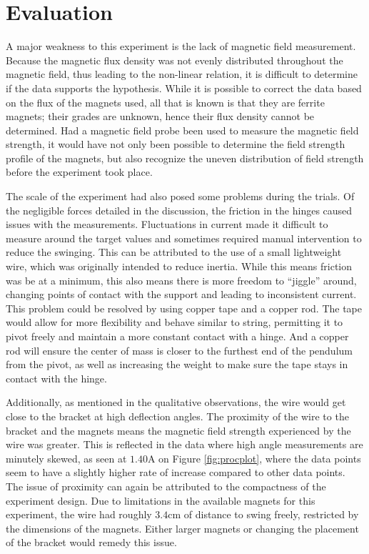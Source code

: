 \section*{Evaluation}

A major weakness to this experiment is the lack of magnetic field measurement.
Because the magnetic flux density was not evenly distributed throughout the magnetic field, thus leading to the non-linear relation, it is difficult to determine if the data supports the hypothesis.
While it is possible to correct the data based on the flux of the magnets used, all that is known is that they are ferrite magnets; their grades are unknown, hence their flux density cannot be determined.
Had a magnetic field probe been used to measure the magnetic field strength, it would have not only been possible to determine the field strength profile of the magnets, but also recognize the uneven distribution of field strength before the experiment took place.

The scale of the experiment had also posed some problems during the trials.
Of the negligible forces detailed in the discussion, the friction in the hinges caused issues with the measurements.
Fluctuations in current made it difficult to measure around the target values and sometimes required manual intervention to reduce the swinging.
This can be attributed to the use of a small lightweight wire, which was originally intended to reduce inertia.
While this means friction was be at a minimum, this also means there is more freedom to ``jiggle'' around, changing points of contact with the support and leading to inconsistent current.
This problem could be resolved by using copper tape and a copper rod.
The tape would allow for more flexibility and behave similar to string, permitting it to pivot freely and maintain a more constant contact with a hinge.
And a copper rod will ensure the center of mass is closer to the furthest end of the pendulum from the pivot, as well as increasing the weight to make sure the tape stays in contact with the hinge.

Additionally, as mentioned in the qualitative observations, the wire would get close to the bracket at high deflection angles.
The proximity of the wire to the bracket and the magnets means the magnetic field strength experienced by the wire was greater.
This is reflected in the data where high angle measurements are minutely skewed, as seen at $1.40\si{\ampere}$ on Figure \ref{fig:procplot}, where the data points seem to have a slightly higher rate of increase compared to other data points.
The issue of proximity can again be attributed to the compactness of the experiment design.
Due to limitations in the available magnets for this experiment, the wire had roughly $3.4\si{\centi\meter}$ of distance to swing freely, restricted by the dimensions of the magnets.
Either larger magnets or changing the placement of the bracket would remedy this issue.

